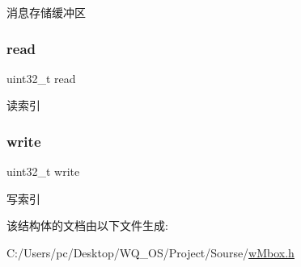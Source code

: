 消息存储缓冲区 \mbox{\label{struct__w_mbox_a0a71cf941cf2509857d61e1443ad8eaa}} 
\subsubsection{\texorpdfstring{read}{read}}
{\footnotesize\ttfamily uint32\+\_\+t read}

读索引 \mbox{\label{struct__w_mbox_ac4c9f9c5eac363cc22ecc18669cc3891}} 
\subsubsection{\texorpdfstring{write}{write}}
{\footnotesize\ttfamily uint32\+\_\+t write}

写索引 

该结构体的文档由以下文件生成\+:\begin{DoxyCompactItemize}
\item 
C\+:/\+Users/pc/\+Desktop/\+W\+Q\+\_\+\+O\+S/\+Project/\+Sourse/\mbox{\hyperlink{w_mbox_8h}{w\+Mbox.\+h}}\end{DoxyCompactItemize}
